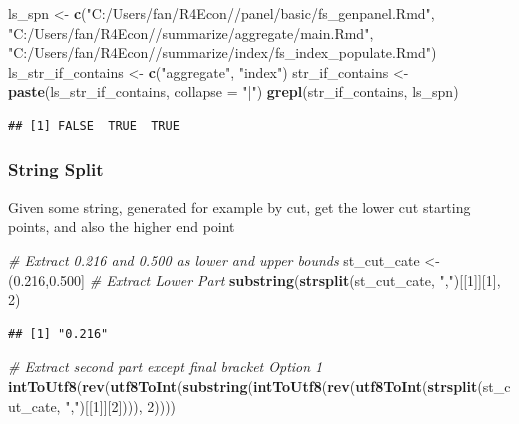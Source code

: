 \documentclass[
]{book}
\newenvironment{Shaded}{\begin{snugshade}}{\end{snugshade}}
\newcommand{\CommentTok}[1]{\textcolor[rgb]{0.56,0.35,0.01}{\textit{#1}}}
\newcommand{\DataTypeTok}[1]{\textcolor[rgb]{0.13,0.29,0.53}{#1}}
\newcommand{\DecValTok}[1]{\textcolor[rgb]{0.00,0.00,0.81}{#1}}
\newcommand{\KeywordTok}[1]{\textcolor[rgb]{0.13,0.29,0.53}{\textbf{#1}}}
\newcommand{\NormalTok}[1]{#1}
\newcommand{\StringTok}[1]{\textcolor[rgb]{0.31,0.60,0.02}{#1}}
\begin{document}
\begin{Shaded}
\begin{Highlighting}[]
\NormalTok{ls\_spn \textless{}{-}}\StringTok{ }\KeywordTok{c}\NormalTok{(}\StringTok{"C:/Users/fan/R4Econ//panel/basic/fs\_genpanel.Rmd"}\NormalTok{,}
            \StringTok{"C:/Users/fan/R4Econ//summarize/aggregate/main.Rmd"}\NormalTok{,}
            \StringTok{"C:/Users/fan/R4Econ//summarize/index/fs\_index\_populate.Rmd"}\NormalTok{)}
\NormalTok{ls\_str\_if\_contains \textless{}{-}}\StringTok{ }\KeywordTok{c}\NormalTok{(}\StringTok{"aggregate"}\NormalTok{, }\StringTok{"index"}\NormalTok{)}
\NormalTok{str\_if\_contains \textless{}{-}}\StringTok{ }\KeywordTok{paste}\NormalTok{(ls\_str\_if\_contains, }\DataTypeTok{collapse =} \StringTok{"|"}\NormalTok{)}
\KeywordTok{grepl}\NormalTok{(str\_if\_contains, ls\_spn)}
\end{Highlighting}
\end{Shaded}

\begin{verbatim}
## [1] FALSE  TRUE  TRUE
\end{verbatim}

\hypertarget{string-split}{%
\subsubsection{String Split}\label{string-split}}

Given some string, generated for example by cut, get the lower cut starting points, and also the higher end point

\begin{Shaded}
\begin{Highlighting}[]
\CommentTok{\# Extract 0.216 and 0.500 as lower and upper bounds}
\NormalTok{st\_cut\_cate \textless{}{-}}\StringTok{ \textquotesingle{}(0.216,0.500]\textquotesingle{}}
\CommentTok{\# Extract Lower Part}
\KeywordTok{substring}\NormalTok{(}\KeywordTok{strsplit}\NormalTok{(st\_cut\_cate, }\StringTok{","}\NormalTok{)[[}\DecValTok{1}\NormalTok{]][}\DecValTok{1}\NormalTok{], }\DecValTok{2}\NormalTok{)}
\end{Highlighting}
\end{Shaded}

\begin{verbatim}
## [1] "0.216"
\end{verbatim}

\begin{Shaded}
\begin{Highlighting}[]
\CommentTok{\# Extract second part except final bracket Option 1}
\KeywordTok{intToUtf8}\NormalTok{(}\KeywordTok{rev}\NormalTok{(}\KeywordTok{utf8ToInt}\NormalTok{(}\KeywordTok{substring}\NormalTok{(}\KeywordTok{intToUtf8}\NormalTok{(}\KeywordTok{rev}\NormalTok{(}\KeywordTok{utf8ToInt}\NormalTok{(}\KeywordTok{strsplit}\NormalTok{(st\_cut\_cate, }\StringTok{","}\NormalTok{)[[}\DecValTok{1}\NormalTok{]][}\DecValTok{2}\NormalTok{]))), }\DecValTok{2}\NormalTok{))))}
\end{Highlighting}
\end{Shaded}
\end{document}
